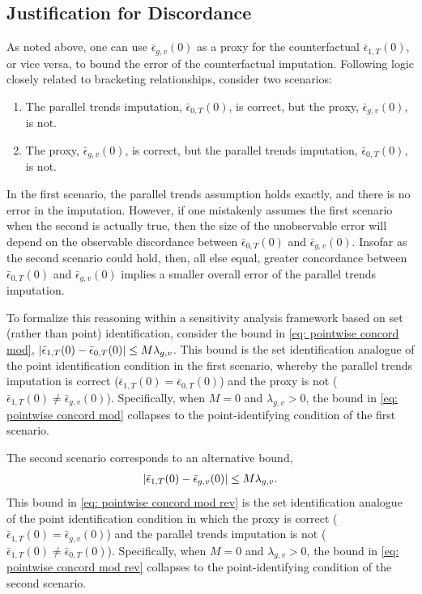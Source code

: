 \documentclass[twoside,11pt]{article}
\begin{document}
\subsection{Justification for Discordance} \label{ssec: concordance}

As noted above, one can use $\bar{\epsilon}_{g,v}(0)$ as a proxy for the counterfactual $\bar{\epsilon}_{1,T}(0)$, or vice versa, to bound the error of the counterfactual imputation. Following logic closely related to bracketing relationships, consider two scenarios:
\begin{enumerate}
\item The parallel trends imputation, $\bar{\epsilon}_{0,T}(0)$, is correct, but the proxy, $\bar{\epsilon}_{g,v}(0)$, is not.
\item The proxy, $\bar{\epsilon}_{g,v}(0)$, is correct, but the parallel trends imputation, $\bar{\epsilon}_{0,T}(0)$, is not.
\end{enumerate}
In the first scenario, the parallel trends assumption holds exactly, and there is no error in the imputation. However, if one mistakenly assumes the first scenario when the second is actually true, then the size of the unobservable error will depend on the observable discordance between $\bar{\epsilon}_{0,T}(0)$ and $\bar{\epsilon}_{g,v}(0)$. Insofar as the second scenario could hold, then, all else equal, greater concordance between $\bar{\epsilon}_{0,T}(0)$ and $\bar{\epsilon}_{g,v}(0)$ implies a smaller overall error of the parallel trends imputation.

To formalize this reasoning within a sensitivity analysis framework based on set (rather than point) identification, consider the bound in \eqref{eq: pointwise concord mod}, $\lvert\bar{\epsilon}_{1,T}(0) - \bar{\epsilon}_{0,T}(0)\rvert \leq M \lambda_{g,v}$. This bound is the set identification analogue of the point identification condition in the first scenario, whereby the parallel trends imputation is correct ($\bar{\epsilon}_{1,T}(0) = \bar{\epsilon}_{0,T}(0)$) and the proxy is not ($\bar{\epsilon}_{1,T}(0) \neq \bar{\epsilon}_{g,v}(0)$). Specifically, when $M = 0$ and $\lambda_{g,v} > 0$, the bound in \eqref{eq: pointwise concord mod} collapses to the point-identifying condition of the first scenario.

The second scenario corresponds to an alternative bound,
\begin{align} \label{eq: pointwise concord mod rev}
\lvert\bar{\epsilon}_{1,T}(0) - \bar{\epsilon}_{g,v}(0)\rvert \leq M \lambda_{g,v}.
\end{align}
This bound in \eqref{eq: pointwise concord mod rev} is the set identification analogue of the point identification condition in which the proxy is correct ($\bar{\epsilon}_{1,T}(0) = \bar{\epsilon}_{g,v}(0)$) and the parallel trends imputation is not ($\bar{\epsilon}_{1,T}(0) \neq \bar{\epsilon}_{0,T}(0)$). Specifically, when $M = 0$ and $\lambda_{g,v} > 0$, the bound in \eqref{eq: pointwise concord mod rev} collapses to the point-identifying condition of the second scenario.
\end{document}
